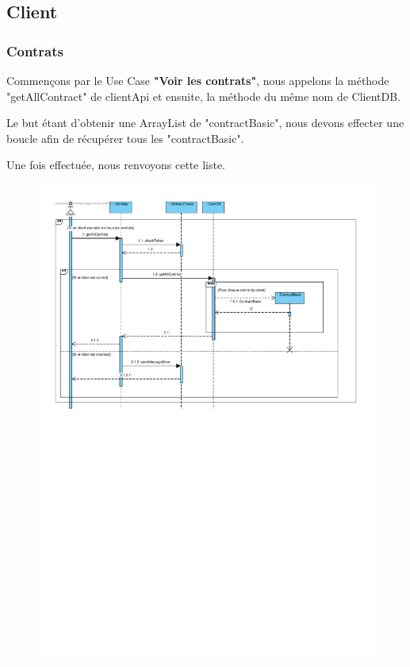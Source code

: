 \newpage
\subsection{Client}

\subsubsection{Contrats}\label{CONTRATS}

\begin{flushleft}
Commençons par le Use Case \textbf{"Voir les contrats"}, nous appelons la méthode "getAllContract" de clientApi et ensuite, la méthode du même nom de ClientDB.
\end{flushleft}

\begin{flushleft}
Le but étant d'obtenir une ArrayList de "contractBasic", nous devons effecter une boucle afin de récupérer tous les "contractBasic".
\end{flushleft}

\begin{flushleft}
Une fois effectuée, nous renvoyons cette liste.
\end{flushleft}

\begin{figure}[h]
\centering
\includegraphics[height = 0.9\textwidth]{Base/sequence/img/client/seqContrats.pdf}
\end{figure}

